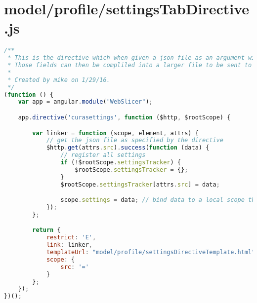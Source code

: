 \section{model/profile/settingsTabDirective.js}
\begin{lstlisting}[language=JavaScript, label={lst:settingsTabDirective}, caption=Each tab in the UI is represented as one of these directives.]
/**
 * This is the directive which when given a json file as an argument will render the settings contained within as fields that can be edited.
 * Those fields can then be compliled into a larger file to be sent to the main server
 *
 * Created by mike on 1/29/16.
 */
(function () {
    var app = angular.module("WebSlicer");

    app.directive('curasettings', function ($http, $rootScope) {

        var linker = function (scope, element, attrs) {
            // get the json file as specified by the directive
            $http.get(attrs.src).success(function (data) {
                // register all settings
                if (!$rootScope.settingsTracker) {
                    $rootScope.settingsTracker = {};
                }
                $rootScope.settingsTracker[attrs.src] = data;

                scope.settings = data; // bind data to a local scope that we can reference easily
            });
        };

        return {
            restrict: 'E',
            link: linker,
            templateUrl: "model/profile/settingsDirectiveTemplate.html",
            scope: {
                src: '='
            }
        };
    });
})();
\end{lstlisting}


